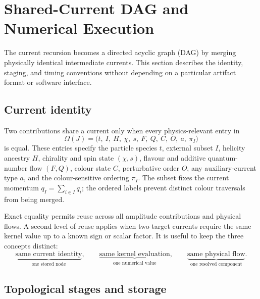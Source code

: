 \section{\texorpdfstring{Shared-Current DAG and Numerical Execution}{Shared-Current DAG and Numerical Execution}}
\label{sec:zgg-dag}

The current recursion becomes a directed acyclic graph (DAG) by merging
physically identical intermediate currents.  This section describes the
identity, staging, and timing conventions without depending on a particular
artifact format or software interface.

\subsection{Current identity}

Two contributions share a current only when every physics-relevant entry in
\begin{equation}
 \Omega(J)=\bigl(
 t,\ I,\ H,\ \chi,\ s,\ F,\ Q,\ C,\ O,\ a,\ \pi_I
 \bigr)
 \label{eq:zgg-current-key}
\end{equation}
is equal.  These entries specify the particle species \(t\), external subset
\(I\), helicity ancestry \(H\), chirality and spin state \((\chi,s)\), flavour
and additive quantum-number flow \((F,Q)\), colour state \(C\), perturbative
order \(O\), any auxiliary-current type \(a\), and the colour-sensitive
ordering \(\pi_I\).  The subset fixes the current momentum
\(q_I=\sum_{i\in I}q_i\); the ordered labels prevent distinct colour
traversals from being merged.

Exact equality permits reuse across all amplitude contributions and physical
flows.  A second level of reuse applies when two target currents require the
same kernel value up to a known sign or scalar factor.  It is useful to keep
the three concepts distinct:
\begin{equation}
 \underbrace{\text{same current identity}}_{\text{one stored node}},\qquad
 \underbrace{\text{same kernel evaluation}}_{\text{one numerical value}},\qquad
 \underbrace{\text{same physical flow}}_{\text{one resolved component}}.
 \label{eq:zgg-three-identities}
\end{equation}

\subsection{Topological stages and storage}


